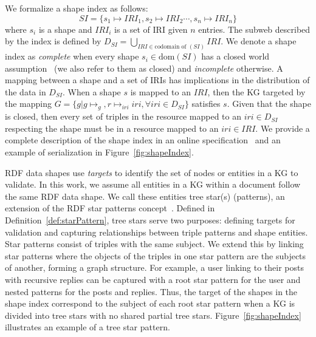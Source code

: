 We formalize a shape index as follows:
\begin{equation}\label{eq:shapeIndex}
   SI = \{s_1 \mapsto IRI_1, s_2 \mapsto IRI_2 \cdots, s_n \mapsto IRI_n\}
\end{equation}
where $s_i$ is a shape and $IRI_i$ is a set of IRI given $n$ entries.
The subweb described by the index is defined by $D_{SI} = \bigcup_{IRI \in \text{codomain of }(SI)} IRI$.
We denote a shape index as \emph{complete} when every shape $s_i \in \text{dom}(SI)$ has a closed world assumption~\cite{Gayo2018b, Gayo2018} (we also refer to them as closed) and \emph{incomplete} otherwise.
A mapping between a shape and a set of IRIs has implications in the distribution of the data in $D_{SI}$.
When a shape $s$ is mapped to an $IRI$, then the KG targeted by the mapping $G = \{g | g \mapsto_{g}, r \mapsto_{iri} iri, \forall iri \in D_{SI}\}$ satisfies $s$.
Given that the shape is closed, then every set of triples in the resource mapped to an $iri \in D_{SI}$ respecting the shape must be in a resource mapped to an $iri \in IRI$.
We provide a complete description of the shape index in an online specification~ and an example of serialization in Figure~\ref{fig:shapeIndex}.

RDF data shapes use \emph{targets} to identify the set of nodes or entities in a KG to validate.  
In this work, we assume all entities in a KG within a document follow the same RDF data shape.  
We call these entities tree star(s) (patterns), an extension of the RDF star patterns concept~\cite{Karim2020}.  
Defined in Definition~\ref{def:starPattern}, tree stars serve two purposes:
defining targets for validation and capturing relationships between triple patterns and shape entities.  
Star patterns consist of triples with the same subject.
We extend this by linking star patterns where the objects of the triples in one star pattern are the subjects of another, forming a graph structure.
For example, a user linking to their posts with recursive replies can be captured with a root star pattern for the user and nested patterns for the posts and replies.  
Thus, the target of the shapes in the shape index correspond to the subject of each root star pattern when a KG is divided into tree stars with no shared partial tree stars.  
Figure~\ref{fig:shapeIndex} illustrates an example of a tree star pattern.


